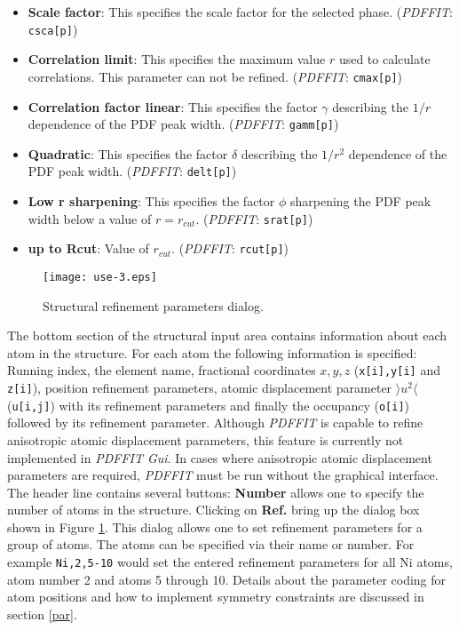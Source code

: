 \begin{itemize}
  \item \textbf{Scale factor}: This specifies the scale factor for the
  selected phase. ({\it PDFFIT}: {\tt csca[p]})

  \item \textbf{Correlation limit}: This specifies the maximum value $r$
  used to calculate correlations. This parameter can not be
  refined. ({\it PDFFIT}: {\tt cmax[p]})

  \item \textbf{Correlation factor linear}: This specifies the factor
  $\gamma$ describing the $1/r$ dependence of the PDF peak width.
  ({\it PDFFIT}: {\tt gamm[p]})

  \item \textbf{Quadratic}: This specifies the factor
  $\delta$ describing the $1/r^2$ dependence of the PDF peak width.
  ({\it PDFFIT}: {\tt delt[p]})

  \item \textbf{Low r sharpening}: This specifies the factor
  $\phi$ sharpening the PDF peak width below a value of $r=r_{cut}$.
  ({\it PDFFIT}: {\tt srat[p]})

  \item \textbf{up to Rcut}: Value of $r_{cut}$.
  ({\it PDFFIT}: {\tt rcut[p]})
\end{itemize}

\begin{figure}[!t]
   \centering
   \texttt{[image: use-3.eps]}
   \caption{Structural refinement parameters dialog.}
   \label{fig_use3}
\end{figure}

The bottom section of the structural input area contains information
about each atom in the structure. For each atom the following
information is specified: Running index, the element name,
fractional coordinates $x,y,z$ ({\tt x[i],y[i]} and {\tt z[i]}),
position refinement parameters, atomic displacement parameter
$\rangle u^2 \langle$ ({\tt u[i,j]}) with its refinement parameters
and finally the occupancy ({\tt o[i]}) followed by its refinement
parameter. Although {\it PDFFIT} is capable to refine anisotropic
atomic displacement parameters, this feature is currently not
implemented in {\it PDFFIT Gui}. In cases where anisotropic atomic
displacement parameters are required, {\it PDFFIT} must be run
without the graphical interface. The header line contains several
buttons: \textbf{Number} allows one to specify the number of atoms
in the structure. Clicking on \textbf{Ref.} bring up the dialog box
shown in Figure \ref{fig_use3}. This dialog allows one to set
refinement parameters for a group of atoms. The atoms can be
specified via their name or number. For example {\tt Ni,2,5-10}
would set the entered refinement parameters for all Ni atoms, atom
number 2 and atoms 5 through 10. Details about the parameter coding
for atom positions and how to implement symmetry constraints are
discussed in section \ref{par}.

